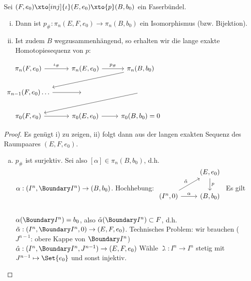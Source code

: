 \begin{st}
    Sei $(F, e_0) \xto[inj]{\iota} (E, e_0) \xto{p} (B, b_0)$ ein Faserbündel.
    \begin{enumerate}[i)]
        \item
            Dann ist $p_\#: \pi_n(E, F, e_0) \to \pi_n(B, b_0)$ ein Isomorphismus (bzw. Bijektion).
        \item
        Ist zudem $B$ wegzusammenhängend, so erhalten wir die lange exakte Homotopiesequenz von $p$:
    \end{enumerate}
    \begin{math}
        \begin{tikzcd}
            \pi_n(F,e_0) \ar[r,"\iota_\#"] & \pi_n(E,e_0) \ar[r,"p_\#"] & \pi_n(B,b_0) \ar[lld] \\
            \pi_{n-1}(F,e_0) \ar[r] \dotsc & ~ & \ar[lld] \\
            \pi_0(F,e_0) \ar[r] & \pi_0(E,e_0) \ar[r] & \pi_0(B,b_0) = 0
        \end{tikzcd}
    \end{math}
    \begin{proof}
        Es genügt i) zu zeigen, ii) folgt dann aus der langen exakten Sequenz des Raumpaares $(E, F, e_0)$.
        \begin{enumerate}[a)]
            \item
                $p_\#$ ist surjektiv.
                Sei also $[\alpha] \in \pi_n(B, b_0)$, d.h. $\alpha: (I^n,\Boundary I^n) \to (B, b_0)$.
                Hochhebung:
                \begin{math}
                    \begin{tikzcd}
                        & (E, e_0) \ar[d,"p"] \\
                        (I^n, 0) \ar[r,"\alpha"] \ar[ru,"\tilde \alpha"] & (B, b_0) \\
                    \end{tikzcd}
                \end{math}
                Es gilt $\alpha(\Boundary I^n) = b_0$, also $\tilde \alpha(\Boundary I^n) \subset F$, d.h. $\tilde \alpha: (I^n, \Boundary I^n, 0) \to (E, F, e_0)$.
                Technisches Problem: wir brauchen ($J^{n-1}$: obere Kappe von $\Boundary I^n$)
                \begin{math}
                    \hat \alpha: (I^n, \Boundary I^n, J^{n-1}) \to (E, F, e_0)
                \end{math}
                Wähle $\gimel: I^n \to I^n$ stetig mit $J^{n-1} \mapsto \Set{e_0}$ und sonst injektiv.

\end{enumerate}
\end{proof}
\end{st}
